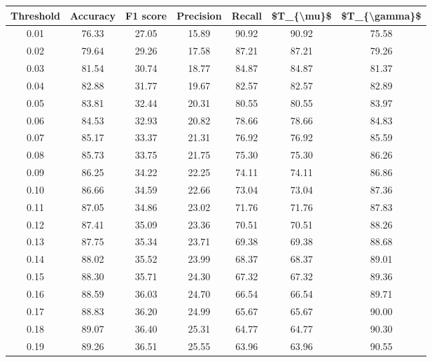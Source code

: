 \begin{tabular}{|c|c|c|c|c|c|c|}
\hline
 Threshold &  Accuracy &  F1 score &  Precision &  Recall &  \$T\_\{\textbackslash mu\}\$ &  \$T\_\{\textbackslash gamma\}\$ \\
\hline
      0.01 &     76.33 &     27.05 &      15.89 &   90.92 &      90.92 &         75.58 \\
      0.02 &     79.64 &     29.26 &      17.58 &   87.21 &      87.21 &         79.26 \\
      0.03 &     81.54 &     30.74 &      18.77 &   84.87 &      84.87 &         81.37 \\
      0.04 &     82.88 &     31.77 &      19.67 &   82.57 &      82.57 &         82.89 \\
      0.05 &     83.81 &     32.44 &      20.31 &   80.55 &      80.55 &         83.97 \\
      0.06 &     84.53 &     32.93 &      20.82 &   78.66 &      78.66 &         84.83 \\
      0.07 &     85.17 &     33.37 &      21.31 &   76.92 &      76.92 &         85.59 \\
      0.08 &     85.73 &     33.75 &      21.75 &   75.30 &      75.30 &         86.26 \\
      0.09 &     86.25 &     34.22 &      22.25 &   74.11 &      74.11 &         86.86 \\
      0.10 &     86.66 &     34.59 &      22.66 &   73.04 &      73.04 &         87.36 \\
      0.11 &     87.05 &     34.86 &      23.02 &   71.76 &      71.76 &         87.83 \\
      0.12 &     87.41 &     35.09 &      23.36 &   70.51 &      70.51 &         88.26 \\
      0.13 &     87.75 &     35.34 &      23.71 &   69.38 &      69.38 &         88.68 \\
      0.14 &     88.02 &     35.52 &      23.99 &   68.37 &      68.37 &         89.01 \\
      0.15 &     88.30 &     35.71 &      24.30 &   67.32 &      67.32 &         89.36 \\
      0.16 &     88.59 &     36.03 &      24.70 &   66.54 &      66.54 &         89.71 \\
      0.17 &     88.83 &     36.20 &      24.99 &   65.67 &      65.67 &         90.00 \\
      0.18 &     89.07 &     36.40 &      25.31 &   64.77 &      64.77 &         90.30 \\
      0.19 &     89.26 &     36.51 &      25.55 &   63.96 &      63.96 &         90.55 \\

\end{tabular}
